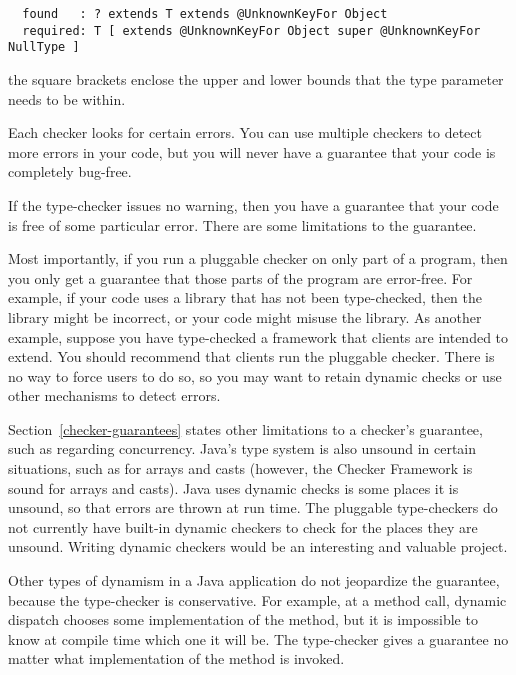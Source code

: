 \begin{Verbatim}
  found   : ? extends T extends @UnknownKeyFor Object
  required: T [ extends @UnknownKeyFor Object super @UnknownKeyFor NullType ]
\end{Verbatim}

\noindent
the square brackets enclose the upper and lower bounds that the type parameter needs to be within.



Each checker looks for certain errors.  You can use multiple checkers to
detect more errors in your code, but you will never have a guarantee that
your code is completely bug-free.

If the type-checker issues no warning, then you have a guarantee that your
code is free of some particular error.  There are some limitations to the
guarantee.

Most importantly, if you run a pluggable checker on only part of a program, then
you only get a guarantee that those parts of the program are error-free.
For example, if your code uses a library that has not been type-checked,
then the library might be incorrect, or your code might misuse the library.
As another example, suppose you have type-checked a framework that clients
are intended to extend.  You should recommend that clients
run the pluggable checker.  There is no way to force users to do so, so you
may want to retain dynamic checks or use other mechanisms to detect errors.

Section~\ref{checker-guarantees} states other limitations to a checker's
guarantee, such as regarding concurrency.  Java's type system is also
unsound in certain situations, such as for arrays and casts (however, the
Checker Framework is sound for arrays and casts).  Java uses dynamic checks
is some places it is unsound, so that errors are thrown at run time.  The
pluggable type-checkers do not currently have built-in dynamic checkers to
check for the places they are unsound.
Writing dynamic checkers would be an interesting and valuable project.

Other types of dynamism in a Java application do not jeopardize the
guarantee, because the type-checker is conservative.  For example, at a
method call, dynamic dispatch chooses some implementation of the method,
but it is impossible to know at compile time which one it will be.  The
type-checker gives a guarantee no matter what implementation of the method
is invoked.

